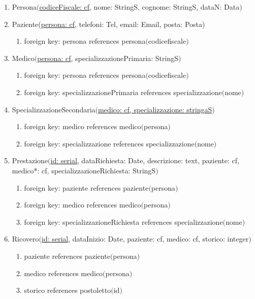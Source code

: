 \documentclass{article}
\begin{document}
\begin{enumerate}
    \item Persona$($\underline{codiceFiscale: cf}, nome: StringS, cognome: StringS, dataN: Data$)$
    \item Paziente(\underline{persona: cf}, telefoni: Tel, email: Email, posta: Posta)
    \begin{enumerate}
        \item foreign key: persona references persona$($codicefiscale$)$
    \end{enumerate}
    \item Medico$($\underline{persona: cf}, specializzazionePrimaria: StringS$)$
    \begin{enumerate}
        \item foreign key: persona references persona$($codicefiscale$)$
        \item foreign key: specializzazionePrimaria references specializzazione$($nome$)$
    \end{enumerate}
    \item SpecializzazioneSecondaria$($\underline{medico: cf, specializzazione: stringaS}$)$
    \begin{enumerate}
        \item foreign key: medico references medico$($persona$)$
        \item foreign key: specializzazione references specializzazione$($nome$)$
    \end{enumerate}
    \item Prestazione$($\underline{id: serial}, dataRichiesta: Date, descrizione: text, paziente: cf, medico*: cf, specializzazioneRichiesta: StringS$)$
    \begin{enumerate}
        \item foreign key: paziente references paziente$($persona$)$
        \item foreign key: medico references medico$($persona$)$
        \item foreign key: specializzazioneRichiesta references specializzazione$($nome$)$
    \end{enumerate}
    \item Ricovero$($\underline{id: serial}, dataInizio: Date, paziente: cf, medico: cf, storico: integer$)$
    \begin{enumerate}
        \item paziente references paziente$($persona$)$
        \item medico references medico$($persona$)$
        \item storico references postoletto$($id$)$

\end{enumerate}
\end{enumerate}
\end{document}
